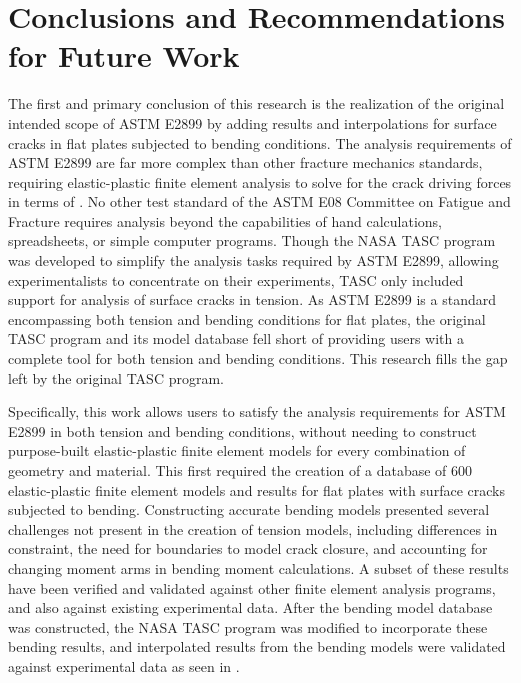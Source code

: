 \chapter{Conclusions and Recommendations for Future Work} \label{chap:conclusions}

The first and primary conclusion of this research is the realization of the original intended scope of ASTM E2899 by adding results and interpolations for surface cracks in flat plates subjected to bending conditions.
The analysis requirements of ASTM E2899 are far more complex than other fracture mechanics standards, requiring elastic-plastic finite element analysis to solve for the crack driving forces in terms of \J.
No other test standard of the ASTM E08 Committee on Fatigue and Fracture requires analysis beyond the capabilities of hand calculations, spreadsheets, or simple computer programs.
Though the NASA TASC program was developed to simplify the analysis tasks required by ASTM E2899, allowing experimentalists to concentrate on their experiments, TASC only included support for analysis of surface cracks in tension.
As ASTM E2899 is a standard encompassing both tension and bending conditions for flat plates, the original TASC program and its model database fell short of providing users with a complete tool for both tension and bending conditions.
This research fills the gap left by the original TASC program.

Specifically, this work allows users to satisfy the analysis requirements for ASTM E2899 in both tension and bending conditions, without needing to construct purpose-built elastic-plastic finite element models for every combination of geometry and material.
This first required the creation of a database of 600 elastic-plastic finite element models and results for flat plates with surface cracks subjected to bending.
Constructing accurate bending models presented several challenges not present in the creation of tension models, including differences in constraint, the need for boundaries to model crack closure, and accounting for changing moment arms in bending moment calculations.
A subset of these results have been verified and validated against other finite element analysis programs, and also against existing experimental data.
After the bending model database was constructed, the NASA TASC program was modified to incorporate these bending results, and interpolated results from the bending models were validated against experimental data as seen in .

